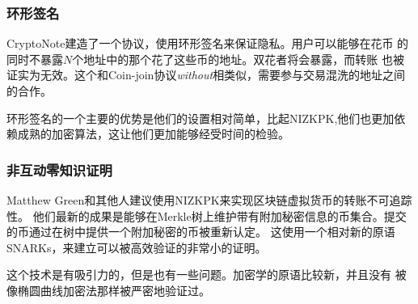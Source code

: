 \documentclass[letterpaper]{article}
\begin{document}
\subsubsection{环形签名}
CryptoNote建造了一个协议，使用环形签名来保证隐私。用户可以能够在花币
的同时不暴露$N$个地址中的那个花了这些币的地址。双花者将会暴露，而转账
也被证实为无效。这个和Coin-join协议\emph{without}相类似，需要参与交易混洗的地址之间的合作。

环形签名的一个主要的优势是他们的设置相对简单，比起NIZKPK,他们也更加依
赖成熟的加密算法，这让他们更加能够经受时间的检验。


\subsubsection{非互动零知识证明}
Matthew Green和其他人建议使用NIZKPK来实现区块链虚拟货币的转账不可追踪性。
他们最新的成果是能够在Merkle树上维护带有附加秘密信息的币集合。提交的币通过在树中提供一个附加秘密的币被重新认定。
这使用一个相对新的原语SNARKs，来建立可以被高效验证的非常小的证明。

这个技术是有吸引力的，但是也有一些问题。加密学的原语比较新，并且没有
被像椭圆曲线加密法那样被严密地验证过。
\end{document}
